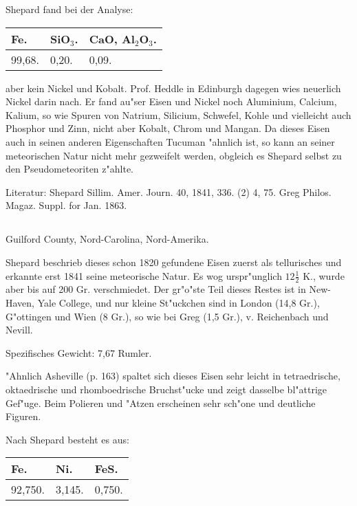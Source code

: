 \documentclass[a4paper, 11pt, oneside]{article}
\begin{document}
Shepard fand bei der Analyse:
\begin{table}[H]
    \centering\swabfamily\Large
    \begin{tabular}{l l l}
        Fe. & SiO$_{3}$. & CaO, Al$_{2}$O$_{3}$. \\ \hline
        99,68. & 0,20. & 0,09. \\
    \end{tabular}
\end{table}

aber kein Nickel und Kobalt. Prof. Heddle in Edinburgh dagegen wies neuerlich Nickel darin nach. Er fand au"ser Eisen und Nickel noch Aluminium, Calcium, Kalium, so wie Spuren von Natrium, Silicium, Schwefel, Kohle und vielleicht auch Phosphor und Zinn, nicht aber Kobalt, Chrom und Mangan. Da dieses Eisen auch in seinen anderen Eigenschaften Tucuman "ahnlich ist, so kann an seiner meteorischen Natur nicht mehr gezweifelt werden, obgleich es Shepard selbst zu den Pseudometeoriten z"ahlte.

\normalsize
Literatur: Shepard Sillim. Amer. Journ. 40, 1841, 336. (2) 4, 75. Greg Philos. Magaz. Suppl. for Jan. 1863.

\subsection{}
\LARGE
\paragraph{}
Guilford County, Nord-Carolina, Nord-Amerika.

Shepard beschrieb dieses schon 1820 gefundene Eisen zuerst als tellurisches und erkannte erst 1841 seine meteorische Natur. Es wog urspr"unglich $\mathfrak{12\frac{1}{2}}$ K., wurde aber bis auf 200 Gr. verschmiedet. Der gr"o"ste Teil dieses Restes ist in New-Haven, Yale College, und nur kleine St"uckchen sind in London (14,8 Gr.), G"ottingen und Wien (8 Gr.), so wie bei Greg (1,5 Gr.), v. Reichenbach und Nevill.

Spezifisches Gewicht: 7,67 Rumler.

"Ahnlich Asheville (p. 163) spaltet sich dieses Eisen sehr leicht in tetraedrische, oktaedrische und rhomboedrische Bruchst"ucke und zeigt dasselbe bl"attrige Gef"uge. Beim Polieren und "Atzen erscheinen sehr sch"one und deutliche Figuren.

Nach Shepard besteht es aus:
\begin{table}[H]
    \centering\swabfamily\Large
    \begin{tabular}{l l l}
        Fe. & Ni. & FeS. \\ \hline
        92,750. & 3,145. & 0,750. \\
    \end{tabular}
\end{table}
\end{document}
